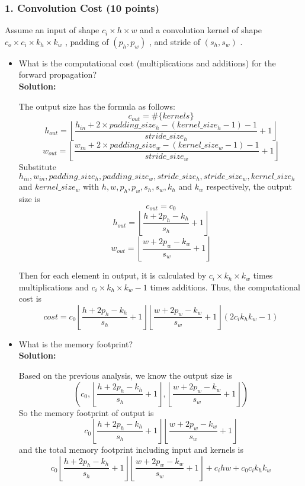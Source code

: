 \documentclass[12pt]{article}%
\begin{document}
    \subsubsection*{1. Convolution Cost (10 points)}
    Assume an input of shape  $c_i\times h\times w$  and a convolution kernel of shape  $c_o\times c_i\times k_h\times k_w$ , padding of  $(p_h,p_w)$ , and stride of  $(s_h,s_w)$ .
    \begin{itemize}
        \item What is the computational cost (multiplications and additions) for the forward propagation?\\
        {\bf Solution:}
        \par The output size has the formula as follows:
        \[c_{out}=\#\{kernels\}\]
        \[h_{out}=\left\lfloor\frac{h_{in}+2\times padding\_size_h-(kernel\_size_h-1)-1}{stride\_size_h}+1\right\rfloor \]
        \[w_{out}=\left\lfloor\frac{w_{in}+2\times padding\_size_w-(kernel\_size_w-1)-1}{stride\_size_w}+1\right\rfloor \]
        Substitute $h_{in}, w_{in}, padding\_size_h, padding\_size_w, stride\_size_h, stride\_size_w, kernel\_size_h$ and $kernel\_size_w$
        with $h, w, p_h,p_w,s_h,s_w,k_h$ and $k_w$ respectively, the output size is
        \[c_{out}=c_0\]
        \[h_{out}=\left\lfloor\frac{h+2p_h-k_h}{s_h}+1\right\rfloor \]
        \[w_{out}=\left\lfloor\frac{w+2p_w-k_w}{s_w}+1\right\rfloor \]

        Then for each element in output, it is calculated by $c_i\times k_h\times k_w$ times multiplications and $c_i\times k_h\times k_w - 1$ times additions.
        Thus, the computational cost is
        \[cost = c_0\left\lfloor\frac{h+2p_h-k_h}{s_h}+1\right\rfloor\left\lfloor\frac{w+2p_w-k_w}{s_w}+1\right\rfloor\left(2c_i k_h k_w-1\right)\]
        \item What is the memory footprint?\\
        {\bf Solution:}
        \par Based on the previous analysis, we know the output size is
        \[\left(c_0,\left\lfloor\frac{h+2p_h-k_h}{s_h}+1\right\rfloor,\left\lfloor\frac{w+2p_w-k_w}{s_w}+1\right\rfloor\right)\]
        So the memory footprint of output is
        \[c_0\left\lfloor\frac{h+2p_h-k_h}{s_h}+1\right\rfloor\left\lfloor\frac{w+2p_w-k_w}{s_w}+1\right\rfloor\]
        and the total memory footprint including input and kernels is
        \[c_0\left\lfloor\frac{h+2p_h-k_h}{s_h}+1\right\rfloor\left\lfloor\frac{w+2p_w-k_w}{s_w}+1\right\rfloor + c_i h w+c_0 c_i k_h k_w\]
    \end{itemize}
\end{document}
